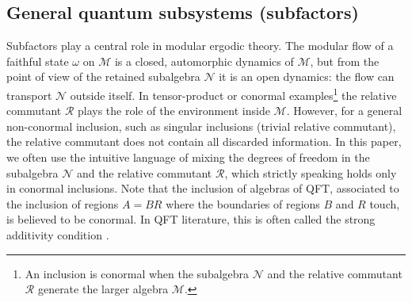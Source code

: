 \documentclass[a4paper,11pt]{article}
\theoremstyle{definition}
\newcommand{\mR}{\mathcal{R}}
\newcommand{\mN}{\mathcal{N}}
\newcommand{\mM}{\mathcal{M}}
\begin{document}
\subsection{General quantum subsystems (subfactors)}
\label{subsec:quantum-coarse}

Subfactors play a central role in modular ergodic theory. The modular flow of a faithful state $\omega$ on $\mM$ is a closed, automorphic dynamics of $\mM$, but from the point of view of the retained subalgebra $\mN$ it is an open dynamics: the flow can transport $\mN$ outside itself. In tensor-product or conormal examples\footnote{An inclusion is conormal when the subalgebra $\mN$ and the relative commutant $\mR$ generate the larger algebra $\mM$.} the relative commutant $\mR$ plays the role of the environment inside $\mM$. However, for a general non-conormal inclusion, such as singular inclusions (trivial relative commutant), the relative commutant does not contain all discarded information. In this paper, we often use the intuitive language of mixing the degrees of freedom in the subalgebra $\mN$ and the relative commutant $\mR$, which strictly speaking holds only in conormal inclusions. Note that the inclusion of algebras of QFT, associated to the inclusion of regions $A=BR$ where the boundaries of regions $B$ and $R$ touch, is believed to be conormal. In QFT literature, this is often called the strong additivity condition \cite{Wiesbrock1994,Guido1998}.
\end{document}
